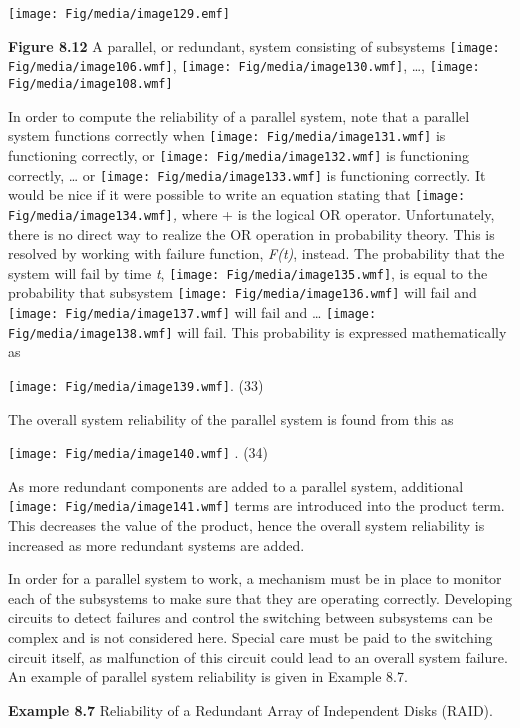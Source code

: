 \texttt{[image: Fig/media/image129.emf]}

\textbf{Figure 8.12} A parallel, or redundant, system consisting of
subsystems \texttt{[image: Fig/media/image106.wmf]},
\texttt{[image: Fig/media/image130.wmf]}, \ldots,
\texttt{[image: Fig/media/image108.wmf]}

In order to compute the reliability of a parallel system, note that a
parallel system functions correctly when
\texttt{[image: Fig/media/image131.wmf]} is functioning correctly, or
\texttt{[image: Fig/media/image132.wmf]} is functioning correctly,
\ldots{} or \texttt{[image: Fig/media/image133.wmf]} is functioning
correctly. It would be nice if it were possible to write an equation
stating that \texttt{[image: Fig/media/image134.wmf]}\emph{,} where + is
the logical OR operator. Unfortunately, there is no direct way to
realize the OR operation in probability theory. This is resolved by
working with failure function, \emph{F(t)}, instead. The probability
that the system will fail by time \emph{t},
\texttt{[image: Fig/media/image135.wmf]}, is equal to the probability
that subsystem \texttt{[image: Fig/media/image136.wmf]} will fail and
\texttt{[image: Fig/media/image137.wmf]} will fail and \ldots{}
\texttt{[image: Fig/media/image138.wmf]} will fail. This probability is
expressed mathematically as

\texttt{[image: Fig/media/image139.wmf]}.
(33)

The overall system reliability of the parallel system is found from this
as

\texttt{[image: Fig/media/image140.wmf]} . (34)

As more redundant components are added to a parallel system, additional
\texttt{[image: Fig/media/image141.wmf]} terms are introduced into the
product term. This decreases the value of the product, hence the overall
system reliability is increased as more redundant systems are added.

In order for a parallel system to work, a mechanism must be in place to
monitor each of the subsystems to make sure that they are operating
correctly. Developing circuits to detect failures and control the
switching between subsystems can be complex and is not considered here.
Special care must be paid to the switching circuit itself, as
malfunction of this circuit could lead to an overall system failure. An
example of parallel system reliability is given in Example 8.7.

\textbf{Example 8.7} Reliability of a Redundant Array of Independent
Disks (RAID).

